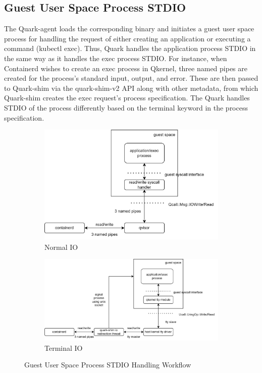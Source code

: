 \subsection{Guest User Space Process STDIO}
The Quark-agent loads the corresponding binary and initiates a guest user space process for handling the request of either creating an application or executing a command (kubectl exec)\cite*{k8s}. Thus, Quark handles the application process STDIO 
in the same way as it handles the exec process STDIO. For instance, when Containerd wishes to create an exec process in Qkernel, three named pipes are created for the process’s standard input, output, and error. These are then passed to Quark-shim 
via the quark-shim-v2 API along with other metadata, from which Quark-shim creates the exec request's process specification. The Quark handles STDIO of the process differently based on the terminal keyword in the process specification. 

\begin{figure}[ht] 
    \begin{subfigure}[b]{0.5\linewidth}
      \centering
      \includegraphics[width=0.9\linewidth]{images/normorl_io.png} 
      \caption{Normal IO} 
      \label{fig1:a} 
      \vspace{4ex}
    \end{subfigure}%
    \begin{subfigure}[b]{0.5\linewidth}
      \centering
      \includegraphics[width=0.9\linewidth]{images/termianl_workflow.png} 
      \caption{Terminal IO} 
      \label{fig1:b} 
      \vspace{4ex}
    \end{subfigure} 
    \caption{Guest User Space Process STDIO Handling Workflow}
    \label{fig1} 
\end{figure}


